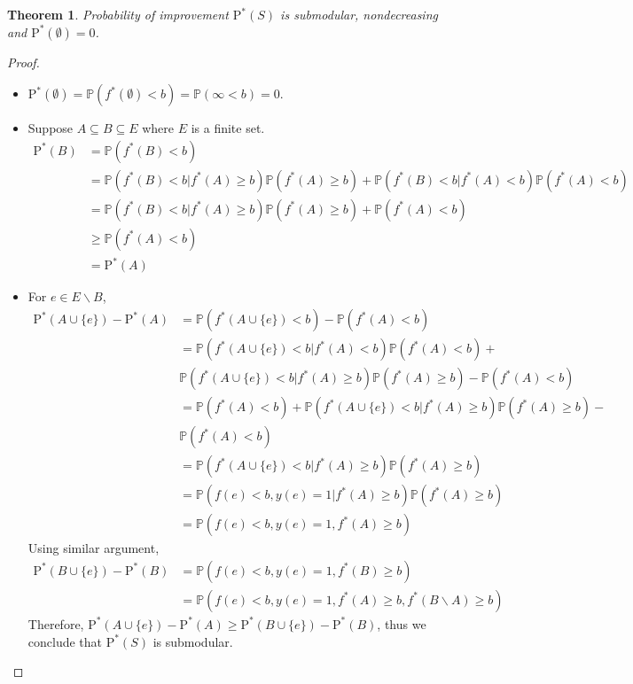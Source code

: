 \documentclass[11pt]{article}
\newcommand{\PI}{\text{P}^*}
\newtheorem{thm}{Theorem}
\begin{document}
\begin{thm} 
Probability of improvement $\PI(S)$ is submodular, nondecreasing and $\PI(\emptyset)=0$.
\end{thm}
\begin{proof}
\begin{itemize}
\item
$\PI(\emptyset) = \mathbb{P}(f^*(\emptyset)<b) = \mathbb{P}(\infty<b)=0$.
\item
Suppose $A \subseteq B \subseteq E$ where $E$ is a finite set.
\begin{align*}
\PI(B) &= \mathbb{P}(f^*(B)<b) \\
       &= \mathbb{P}(f^*(B)<b |f^*(A) \geq b) \mathbb{P}(f^*(A) \geq b) + \mathbb{P}(f^*(B)<b |f^*(A)<b) \mathbb{P}(f^*(A)<b) \\
       &= \mathbb{P}(f^*(B)<b |f^*(A) \geq b) \mathbb{P}(f^*(A) \geq b) + \mathbb{P}(f^*(A)<b) \\
       &\geq \mathbb{P}(f^*(A)<b) \\
       &= \PI(A)
\end{align*}
\item
For $e \in E\backslash B$,
\begin{align*}
\PI(A \cup \{e\}) - \PI(A) &= \mathbb{P}(f^*(A \cup \{e\})<b)-\mathbb{P}(f^*(A)<b)\\
                           &= \mathbb{P}(f^*(A \cup \{e\})<b|f^*(A)<b)\mathbb{P}(f^*(A)<b) + \\
                           &\mathbb{P}(f^*(A \cup \{e\})<b|f^*(A)\geq b)\mathbb{P}(f^*(A)\geq b) -\mathbb{P}(f^*(A)<b) \\
                           &=\mathbb{P}(f^*(A)<b) + \mathbb{P}(f^*(A \cup \{e\})<b|f^*(A)\geq b)\mathbb{P}(f^*(A)\geq b) -\\
                           &\mathbb{P}(f^*(A)<b)\\
                           &= \mathbb{P}(f^*(A \cup \{e\})<b|f^*(A)\geq b)\mathbb{P}(f^*(A)\geq b) \\
                           &= \mathbb{P}(f(e)<b, y(e)=1|f^*(A)\geq b)\mathbb{P}(f^*(A)\geq b) \\
                           &= \mathbb{P}(f(e)<b, y(e)=1,f^*(A)\geq b)
\end{align*}
Using similar argument,
\begin{align*}
\PI(B \cup \{e\}) - \PI(B) &= \mathbb{P}(f(e)<b, y(e)=1,f^*(B)\geq b) \\
                           &= \mathbb{P}(f(e)<b, y(e)=1,f^*(A)\geq b, f^*(B\backslash A) \geq b )
\end{align*}
Therefore, $\PI(A \cup \{e\}) - \PI(A) \geq \PI(B \cup \{e\}) - \PI(B)$, thus we conclude that $\PI(S)$ is submodular.
\end{itemize}
\end{proof}
\end{document}
